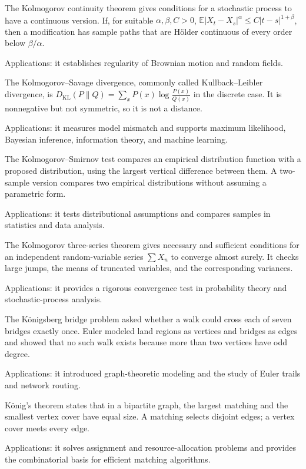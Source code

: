 The Kolmogorov continuity theorem gives conditions for a stochastic process to have a continuous version. If, for suitable $\alpha,\beta,C>0$, $\mathbb E|X_t-X_s|^\alpha\leq C|t-s|^{1+\beta}$, then a modification has sample paths that are Hölder continuous of every order below $\beta/\alpha$. \par\noindent Applications: it establishes regularity of Brownian motion and random fields.

The Kolmogorov--Savage divergence, commonly called Kullback--Leibler divergence, is $D_{\mathrm{KL}}(P\|Q)=\sum_xP(x)\log\frac{P(x)}{Q(x)}$ in the discrete case. It is nonnegative but not symmetric, so it is not a distance. \par\noindent Applications: it measures model mismatch and supports maximum likelihood, Bayesian inference, information theory, and machine learning.

The Kolmogorov--Smirnov test compares an empirical distribution function with a proposed distribution, using the largest vertical difference between them. A two-sample version compares two empirical distributions without assuming a parametric form. \par\noindent Applications: it tests distributional assumptions and compares samples in statistics and data analysis.

The Kolmogorov three-series theorem gives necessary and sufficient conditions for an independent random-variable series $\sum X_n$ to converge almost surely. It checks large jumps, the means of truncated variables, and the corresponding variances. \par\noindent Applications: it provides a rigorous convergence test in probability theory and stochastic-process analysis.

The Königsberg bridge problem asked whether a walk could cross each of seven bridges exactly once. Euler modeled land regions as vertices and bridges as edges and showed that no such walk exists because more than two vertices have odd degree. \par\noindent Applications: it introduced graph-theoretic modeling and the study of Euler trails and network routing.

König's theorem states that in a bipartite graph, the largest matching and the smallest vertex cover have equal size. A matching selects disjoint edges; a vertex cover meets every edge. \par\noindent Applications: it solves assignment and resource-allocation problems and provides the combinatorial basis for efficient matching algorithms.

